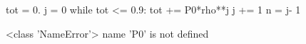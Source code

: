 
tot = 0.
j = 0
while tot <= 0.9:
   tot += P0*rho**j
   j += 1
n = j- 1

<class 'NameError'>
name 'P0' is not defined
